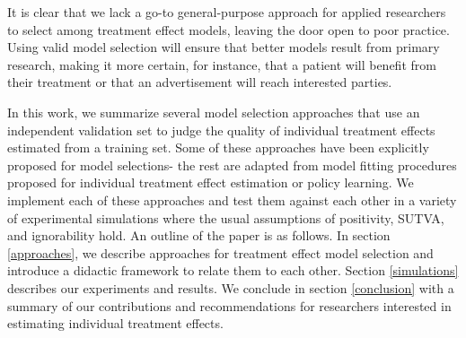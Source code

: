 It is clear that we lack a go-to general-purpose approach for applied researchers to select among treatment effect models, leaving the door open to poor practice. Using valid model selection will ensure that better models result from primary research, making it more certain, for instance, that a patient will benefit from their treatment or that an advertisement will reach interested parties. 

In this work, we summarize several model selection approaches that use an independent validation set to judge the quality of individual treatment effects estimated from a training set. Some of these approaches have been explicitly proposed for model selections- the rest are adapted from model fitting procedures proposed for individual treatment effect estimation or policy learning. We implement each of these approaches and test them against each other in a variety of experimental simulations where the usual assumptions of positivity, SUTVA, and ignorability hold. An outline of the paper is as follows. In section \ref{approaches}, we describe approaches for treatment effect model selection and introduce a didactic framework to relate them to each other. Section \ref{simulations} describes our experiments and results. We conclude in section \ref{conclusion} with a summary of our contributions and recommendations for researchers interested in estimating individual treatment effects.
